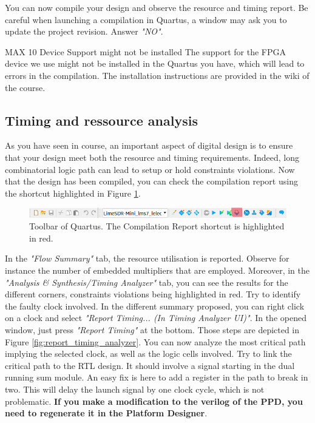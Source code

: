 You can now compile your design and observe the resource and timing report. Be careful when launching a compilation in Quartus, a window may ask you to update the project revision. Answer \textit{"NO"}.

\begin{bclogo}[couleur = gray!20, arrondi = 0.2, logo=\bcattention]{MAX 10 Device Support might not be installed}
    The support for the FPGA device we use might not be installed in the Quartus you have, which will lead to errors in the compilation. The installation instructions are provided in the wiki of the course.

\end{bclogo}

\subsection{Timing and ressource analysis}

As you have seen in course, an important aspect of digital design is to ensure that your design meet both the resource and timing requirements. Indeed, long combinatorial logic path can lead to setup or hold constraints violations. Now that the design has been compiled, you can check the compilation report using the shortcut highlighted in Figure \ref{fig:compilation_report_button}.

\begin{figure}[h]
    \centering
    \includegraphics[width=\linewidth]{figures/Compilation_report_button.PNG}
    \caption{Toolbar of Quartus. The Compilation Report shortcut is highlighted in red.}
    \label{fig:compilation_report_button}
\end{figure}


In the \textit{"Flow Summary"} tab, the resource utilisation is reported. Observe for instance the number of embedded multipliers that are employed. Moreover, in the \textit{"Analysis \& Synthesis/Timing Analyzer"} tab, you can see the results for the different corners, constraints violations being highlighted in red. Try to identify the faulty clock involved. In the different summary proposed, you can right click on a clock and select \textit{"Report Timing... (In Timing Analyzer UI)"}. In the opened window, just press \textit{"Report Timing"} at the bottom. Those steps are depicted in Figure \ref{fig:report_timing_analyzer}. You can now analyze the most critical path implying the selected clock, as well as the logic cells involved. Try to link the critical path to the RTL design. It should involve a signal starting in the dual running sum module. An easy fix is here to add a register in the path to break in two. This will delay the launch signal by one clock cycle, which is not problematic. \textbf{If you make a modification to the verilog of the PPD, you need to regenerate it in the Platform Designer}.

